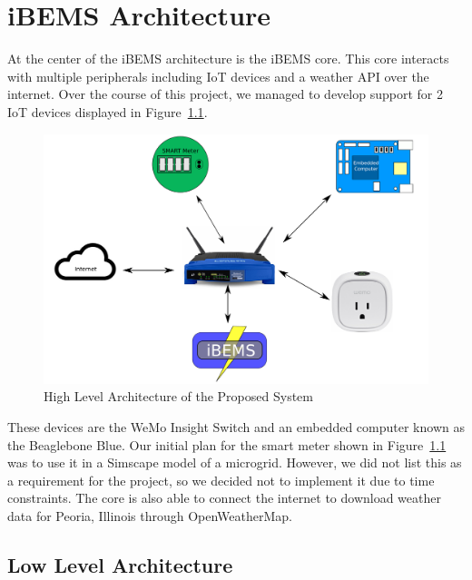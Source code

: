 \chapter{iBEMS Architecture}
\label{ch: Chapter2}


At the center of the iBEMS architecture is the iBEMS core. This core interacts
with multiple peripherals including IoT devices and a weather API over the
internet. Over the course of this project, we managed to develop support for 2
IoT devices displayed in Figure~\ref{fig:highLevelArchitecture}. %
%
\begin{figure}[H]
  \centering
  \includegraphics[scale=0.3]{figs/overallConnectionDiagram.pdf}
  \caption{High Level Architecture of the Proposed System}
  \label{fig:highLevelArchitecture}
\end{figure}
%
These devices are the WeMo Insight Switch and an embedded computer known as the Beaglebone
Blue. Our initial plan for the smart meter shown in
Figure~\ref{fig:highLevelArchitecture} was to use it in a Simscape model of a
microgrid. However, we did not list this as a requirement for the project, so we
decided not to implement it due to time constraints. The core is also able to
connect the internet to download weather data for Peoria, Illinois through
OpenWeatherMap.

\section{Low Level Architecture}

